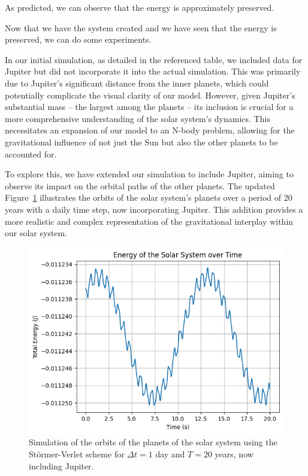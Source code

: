 \documentclass{article}
\begin{document}
As predicted, we can observe that the energy is approximately preserved.

Now that we have the system created and we have seen that the energy is preserved, we can do some experiments. 

\label{sec:expanding_n_body_problem}

In our initial simulation, as detailed in the referenced table, we included data for Jupiter but did not incorporate it into the actual simulation. This was primarily due to Jupiter's significant distance from the inner planets, which could potentially complicate the visual clarity of our model. However, given Jupiter's substantial mass – the largest among the planets – its inclusion is crucial for a more comprehensive understanding of the solar system's dynamics. This necessitates an expansion of our model to an N-body problem, allowing for the gravitational influence of not just the Sun but also the other planets to be accounted for.

To explore this, we have extended our simulation to include Jupiter, aiming to observe its impact on the orbital paths of the other planets. The updated Figure~\ref{fig:solarsystemjupiter} illustrates the orbits of the solar system's planets over a period of 20 years with a daily time step, now incorporating Jupiter. This addition provides a more realistic and complex representation of the gravitational interplay within our solar system.

\begin{figure}[H]
	\centering
	\includegraphics[width=0.5\linewidth]{./Figures/SolarSystem/orbitsjupiter.png}
	\caption{Simulation of the orbits of the planets of the solar system using the Störmer-Verlet scheme for \(\Delta t = 1\) day and \(T = 20\) years, now including Jupiter.}
	\label{fig:solarsystemjupiter}
\end{figure}


\label{sec:using_symplectic_euler_method}
\end{document}
